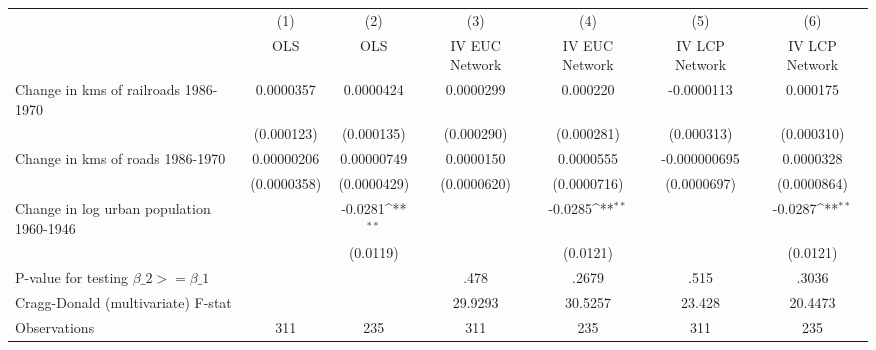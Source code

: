 {
\def\sym#1{\ifmmode^{#1}\else\(^{#1}\)\fi}
\begin{tabular}{l*{6}{c}}
\hline\hline
                &\multicolumn{1}{c}{(1)}&\multicolumn{1}{c}{(2)}&\multicolumn{1}{c}{(3)}&\multicolumn{1}{c}{(4)}&\multicolumn{1}{c}{(5)}&\multicolumn{1}{c}{(6)}\\
                &\multicolumn{1}{c}{OLS}&\multicolumn{1}{c}{OLS}&\multicolumn{1}{c}{IV EUC Network}&\multicolumn{1}{c}{IV EUC Network}&\multicolumn{1}{c}{IV LCP Network}&\multicolumn{1}{c}{IV LCP Network}\\
\hline
Change in kms of railroads 1986-1970&0.0000357         &0.0000424         &0.0000299         & 0.000220         &-0.0000113         & 0.000175         \\
                &(0.000123)         &(0.000135)         &(0.000290)         &(0.000281)         &(0.000313)         &(0.000310)         \\
[1em]
Change in kms of roads 1986-1970&0.00000206         &0.00000749         &0.0000150         &0.0000555         &-0.000000695         &0.0000328         \\
                &(0.0000358)         &(0.0000429)         &(0.0000620)         &(0.0000716)         &(0.0000697)         &(0.0000864)         \\
[1em]
Change in log urban population 1960-1946&                  &  -0.0281\sym{**} &                  &  -0.0285\sym{**} &                  &  -0.0287\sym{**} \\
                &                  & (0.0119)         &                  & (0.0121)         &                  & (0.0121)         \\
\hline
P-value for testing $\beta\_{2} >= \beta\_{1}$&                  &                  &     .478         &    .2679         &     .515         &    .3036         \\
Cragg-Donald (multivariate) F-stat&                  &                  &  29.9293         &  30.5257         &   23.428         &  20.4473         \\
Observations    &      311         &      235         &      311         &      235         &      311         &      235         \\
\hline\hline
\end{tabular}
}
